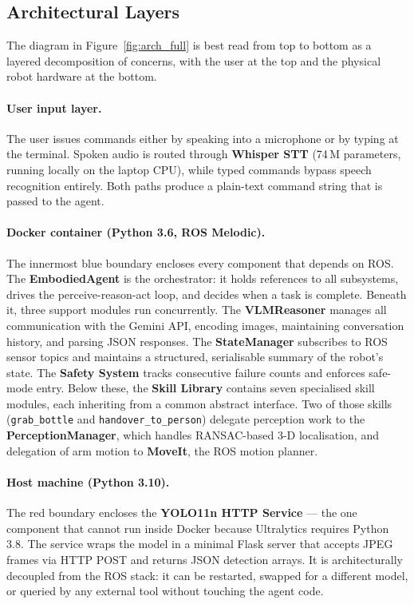\subsection{Architectural Layers}

The diagram in Figure~\ref{fig:arch_full} is best read from top to bottom as a
layered decomposition of concerns, with the user at the top and the physical
robot hardware at the bottom.

\paragraph{User input layer.}
The user issues commands either by speaking into a microphone or by typing at
the terminal.
Spoken audio is routed through \textbf{Whisper STT} (74\,M parameters, running
locally on the laptop CPU), while typed commands bypass speech recognition
entirely.
Both paths produce a plain-text command string that is passed to the agent.

\paragraph{Docker container (Python 3.6, ROS Melodic).}
The innermost blue boundary encloses every component that depends on ROS.
The \textbf{EmbodiedAgent} is the orchestrator: it holds references to all
subsystems, drives the perceive-reason-act loop, and decides when a task is
complete.
Beneath it, three support modules run concurrently.
The \textbf{VLMReasoner} manages all communication with the Gemini API,
encoding images, maintaining conversation history, and parsing JSON responses.
The \textbf{StateManager} subscribes to ROS sensor topics and maintains a
structured, serialisable summary of the robot's state.
The \textbf{Safety System} tracks consecutive failure counts and enforces
safe-mode entry.
Below these, the \textbf{Skill Library} contains seven specialised skill
modules, each inheriting from a common abstract interface.
Two of those skills (\texttt{grab\_bottle} and \texttt{handover\_to\_person})
delegate perception work to the \textbf{PerceptionManager}, which handles
RANSAC-based 3-D localisation, and delegation of arm motion to
\textbf{MoveIt}, the ROS motion planner.

\paragraph{Host machine (Python 3.10).}
The red boundary encloses the \textbf{YOLO11n HTTP Service} --- the one
component that cannot run inside Docker because Ultralytics requires Python 3.8.
The service wraps the model in a minimal Flask server that accepts JPEG frames
via HTTP POST and returns JSON detection arrays.
It is architecturally decoupled from the ROS stack: it can be restarted,
swapped for a different model, or queried by any external tool without touching
the agent code.

